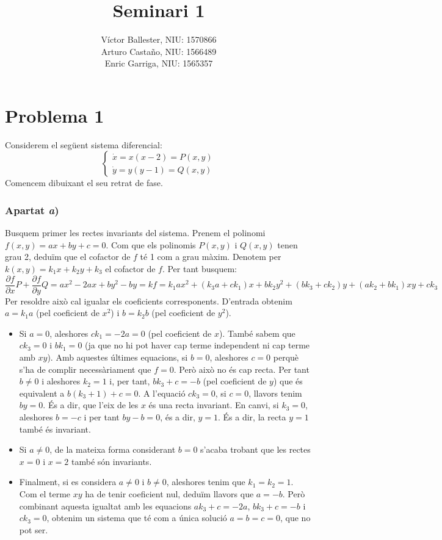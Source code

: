 \documentclass[10pt,a4paper]{article}
\title{\bfseries\Large Seminari 1}
\author{Víctor Ballester, NIU: 1570866\\ Arturo Castaño, NIU: 1566489\\ Enric Garriga, NIU: 1565357}
\date{\parbox{\linewidth}{\centering
  Equacions diferencials II\endgraf
  Grau en Matemàtiques\endgraf
  Universitat Autònoma de Barcelona\endgraf
  Març de 2022}}
\begin{document}
\maketitle
\section*{Problema 1}
Considerem el següent sistema diferencial:
\begin{equation}
  \begin{cases}
    \dot{x}=x(x-2)=P(x,y) \\
    \dot{y}=y(y-1)=Q(x,y)
  \end{cases}
\end{equation}
Comencem dibuixant el seu retrat de fase.
\subsubsection*{Apartat \emph{a})}
Busquem primer les rectes invariants del sistema. Prenem el polinomi $f(x,y)=ax+by+c=0$. Com que els polinomis $P(x,y)$ i $Q(x,y)$ tenen grau 2, deduïm que el cofactor de $f$ té 1 com a grau màxim. Denotem per $k(x,y)=k_1x+k_2y+k_3$ el cofactor de $f$. Per tant busquem:
$$\frac{\partial f}{\partial x}P+\frac{\partial f}{\partial y}Q=ax^2-2ax+by^2-by=kf=k_1ax^2+(k_3a+ck_1)x+bk_2y^2+(bk_3+ck_2)y+(ak_2+bk_1)xy+ck_3$$
Per resoldre això cal igualar els coeficients corresponents. D'entrada obtenim $a=k_1a$ (pel coeficient de $x^2$) i $b=k_2b$ (pel coeficient de $y^2$).
\begin{itemize}
  \item Si $a=0$, aleshores $ck_1=-2a=0$ (pel coeficient de $x$). També sabem que $ck_3=0$ i $bk_1=0$ (ja que no hi pot haver cap terme independent ni cap terme amb $xy$). Amb aquestes últimes equacions, si $b=0$, aleshores $c=0$ perquè s'ha de complir necessàriament que $f=0$. Però això no és cap recta. Per tant $b\neq 0$ i aleshores $k_2=1$ i, per tant, $bk_3+c=-b$ (pel coeficient de $y$) que és equivalent a $b(k_3+1)+c=0$. A l'equació $ck_3=0$, si $c=0$, llavors tenim $by=0$. És a dir, que l'eix de les $x$ és una recta invariant. En canvi, si $k_3=0$, aleshores $b=-c$ i per tant $by-b=0$, és a dir, $y=1$. És a dir, la recta $y=1$ també és invariant.
  \item Si $a\ne 0$, de la mateixa forma considerant $b=0$ s'acaba trobant que les rectes $x=0$ i $x=2$ també són invariants.
  \item Finalment, si es considera $a\neq 0$ i $b\neq 0$, aleshores tenim que $k_1=k_2=1$. Com el terme $xy$ ha de tenir coeficient nul, deduïm llavors que $a=-b$. Però combinant aquesta igualtat amb les equacions $ak_3+c=-2a$, $bk_3+c=-b$ i $ck_3=0$, obtenim un sistema que té com a única solució $a=b=c=0$, que no pot ser.
\end{itemize}
\end{document}
